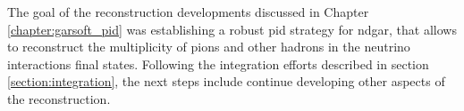 \begin{comment}
Chapter \ref{chapter:garsoft_pid} reviews my work on the reconstruction for \gls{ndgar}. In section \ref{section:dEdx} I try to establish the relation between the measured charge in the readout and the deposited energy from a stopping proton sample, using the residual range of the tracks. This calibration allows to compute the mean $\mathrm{d}E/\mathrm{d}x$ for the particles. I finish the section providing a parametrisation for how this depends on the momentum. The problem of the muon and pion separation is the topic of section \ref{section:muon_bdt}. I propose to use the information from the \gls{ecal} to achieve this classification. In this section, I describe the features and the procedure I follow to train the classifier, showing its performance as a function of the particle momentum. In section \ref{section:tof} I explore the possibility of performing a \gls{tof} measurement with the \gls{ecal}. With this, I achieve a separation between pions and protons in a momentum range beyond the reach of the HPgTPC alone. Section \ref{section:pi_decay} is devoted to the identification of charged particle decays inside the HPgTPC where the parent plus (charged) daughter system is reconstructed as a single track. I use the information from the track fit to construct a series of variables which can identify the tracks containing decays, as well as locate their position. I finish the Chapter introducing a new clustering algorithm for the \gls{ecal} hits in section \ref{section:neutral}. It aims at having a one-to-one correspondence between particles and clusters, which will facilitate the reconstruction of neutral particles in the \gls{ecal}.

The goal of these developments was establishing a robust \gls{pid} strategy for \gls{ndgar}, that allows to reconstruct the multiplicity of pions and other hadrons in the neutrino interactions final states. In section \ref{section:integration} I describe the status of the integration of the different additions to the reconstruction chain.
\end{comment}

The goal of the reconstruction developments discussed in Chapter \ref{chapter:garsoft_pid} was establishing a robust \gls{pid} strategy for \gls{ndgar}, that allows to reconstruct the multiplicity of pions and other hadrons in the neutrino interactions final states. Following the integration efforts described in section \ref{section:integration}, the next steps include continue developing other aspects of the reconstruction.

